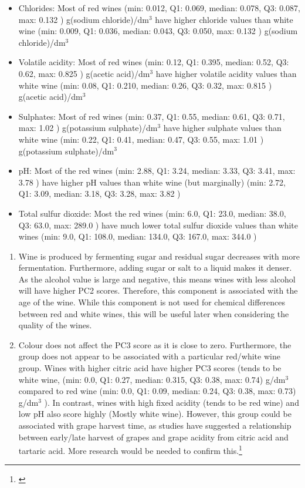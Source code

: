 \documentclass[
]{article}
\providecommand{\tightlist}{%
  \setlength{\itemsep}{0pt}\setlength{\parskip}{0pt}}
\begin{document}
\begin{itemize}
\tightlist
\item
  Chlorides: Most of red wines (min: 0.012, Q1: 0.069, median: 0.078,
  Q3: 0.087, max: 0.132 ) g(sodium chloride)/dm\(^3\) have higher
  chloride values than white wine (min: 0.009, Q1: 0.036, median: 0.043,
  Q3: 0.050, max: 0.132 ) g(sodium chloride)/dm\(^3\)
\item
  Volatile acidity: Most of red wines (min: 0.12, Q1: 0.395, median:
  0.52, Q3: 0.62, max: 0.825 ) g(acetic acid)/dm\(^3\) have higher
  volatile acidity values than white wine (min: 0.08, Q1: 0.210, median:
  0.26, Q3: 0.32, max: 0.815 ) g(acetic acid)/dm\(^3\)
\item
  Sulphates: Most of red wines (min: 0.37, Q1: 0.55, median: 0.61, Q3:
  0.71, max: 1.02 ) g(potassium sulphate)/dm\(^3\) have higher sulphate
  values than white wine (min: 0.22, Q1: 0.41, median: 0.47, Q3: 0.55,
  max: 1.01 ) g(potassium sulphate)/dm\(^3\)
\item
  pH: Most of the red wines (min: 2.88, Q1: 3.24, median: 3.33, Q3:
  3.41, max: 3.78 ) have higher pH values than white wine (but
  marginally) (min: 2.72, Q1: 3.09, median: 3.18, Q3: 3.28, max: 3.82 )
\item
  Total sulfur dioxide: Most the red wines (min: 6.0, Q1: 23.0, median:
  38.0, Q3: 63.0, max: 289.0 ) have much lower total sulfur dioxide
  values than white wines (min: 9.0, Q1: 108.0, median: 134.0, Q3:
  167.0, max: 344.0 )
\end{itemize}

\begin{enumerate}
\def\labelenumi{\arabic{enumi}.}
\setcounter{enumi}{1}
\item
  Wine is produced by fermenting sugar and residual sugar decreases with
  more fermentation. Furthermore, adding sugar or salt to a liquid makes
  it denser. As the alcohol value is large and negative, this means
  wines with less alcohol will have higher PC2 scores. Therefore, this
  component is associated with the age of the wine. While this component
  is not used for chemical differences between red and white wines, this
  will be useful later when considering the quality of the wines.
\item
  Colour does not affect the PC3 score as it is close to zero.
  Furthermore, the group does not appear to be associated with a
  particular red/white wine group. Wines with higher citric acid have
  higher PC3 scores (tends to be white wine, (min: 0.0, Q1: 0.27,
  median: 0.315, Q3: 0.38, max: 0.74) g/dm\(^3\) compared to red wine
  (min: 0.0, Q1: 0.09, median: 0.24, Q3: 0.38, max: 0.73) g/dm\(^3\) ).
  In contrast, wines with high fixed acidity (tends to be red wine) and
  low pH also score highly (Mostly white wine). However, this group
  could be associated with grape harvest time, as studies have suggested
  a relationship between early/late harvest of grapes and grape acidity
  from citric acid and tartaric acid. More research would be needed to
  confirm this.\footnote{\textcite{RN4}}
\end{enumerate}
\end{document}
